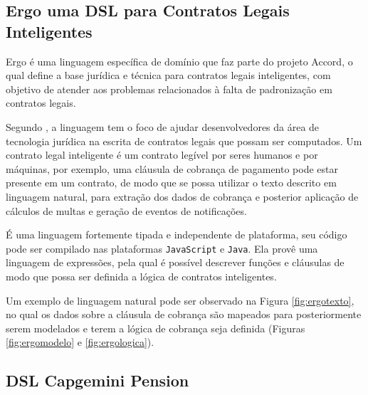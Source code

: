 






\newpage
\subsection{Ergo uma DSL para Contratos Legais Inteligentes}
\label{ergo}

Ergo é uma linguagem específica de domínio que faz parte do projeto Accord, o qual define a base jurídica e técnica para contratos legais inteligentes, com objetivo de atender aos problemas relacionados à falta de padronização em contratos legais. 

Segundo , a linguagem tem o foco de ajudar desenvolvedores da área de tecnologia jurídica na escrita de contratos legais que possam ser computados. Um contrato legal inteligente é um contrato legível por seres humanos e por máquinas, por exemplo, uma cláusula de cobrança de pagamento pode estar presente em um contrato, de modo que se possa utilizar o texto descrito em linguagem natural, para extração dos dados de cobrança e posterior aplicação de cálculos de multas e geração de eventos de notificações. 


É uma linguagem fortemente tipada e independente de plataforma, seu código pode ser compilado nas plataformas \texttt{JavaScript} e \texttt{Java}. Ela provê uma linguagem de expressões, pela qual é possível descrever funções e cláusulas de modo que possa ser definida a lógica de contratos inteligentes. 

Um exemplo de linguagem natural pode ser observado na Figura \ref{fig:ergotexto}, no qual os dados sobre a cláusula de cobrança são mapeados para posteriormente serem modelados e terem a lógica de cobrança seja definida (Figuras \ref{fig:ergomodelo} e \ref{fig:ergologica}). 







\newpage

\subsection{DSL Capgemini Pension}
\label{capgeminipension}

